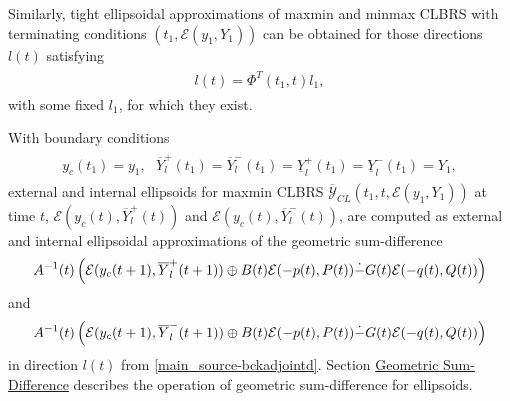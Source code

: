 \documentclass[letterpaper,10pt,english]{sphinxmanual}
\begin{document}
Similarly, tight ellipsoidal approximations of maxmin and minmax CLBRS
with terminating conditions $(t_1, {\mathcal E}(y_1,Y_1))$ can be
obtained for those directions $l(t)$ satisfying
\label{main_source:equation-bckadjointd}\begin{gather}
\begin{split}l(t) = \Phi^T(t_1,t)l_1,\end{split}\label{main_source-bckadjointd}
\end{gather}
with some fixed $l_1$, for which they exist.

With boundary conditions
\label{main_source:equation-bndconds}\begin{gather}
\begin{split}y_c(t_1)=y_1, ~~~ \overline{Y}^+_l(t_1)=\overline{Y}^-_l(t_1)=\underline{Y}^+_l(t_1)=\underline{Y}^-_l(t_1)=Y_1,\end{split}\label{main_source-bndconds}
\end{gather}
external and internal ellipsoids for maxmin CLBRS
$\overline{{\mathcal Y}}_{CL}(t_1,t,{\mathcal E}(y_1,Y_1))$ at
time $t$, ${\mathcal E}(y_c(t),\overline{Y}^+_l(t))$ and
${\mathcal E}(y_c(t),\overline{Y}^-_l(t))$, are computed as
external and internal ellipsoidal approximations of the geometric
sum-difference
\begin{gather}
\begin{split}A^{-1}(t)\left(
{\mathcal E}(y_c(t+1),\overline{Y}^+_l(t+1)) \oplus B(t){\mathcal E}(-p(t),P(t))
\dot{-}G(t){\mathcal E}(-q(t),Q(t))
\right)\end{split}\notag
\end{gather}
and
\begin{gather}
\begin{split}A^{-1}(t)\left(
{\mathcal E}(y_c(t+1),\overline{Y}^-_l(t+1)) \oplus B(t){\mathcal E}(-p(t),P(t))
\dot{-}G(t){\mathcal E}(-q(t),Q(t))
\right)\end{split}\notag
\end{gather}
in direction $l(t)$ from \eqref{main_source-bckadjointd}. Section
{\hyperref[main_source:geometric-sum-difference]{Geometric Sum-Difference}} describes the operation of geometric
sum-difference for ellipsoids.
\end{document}

